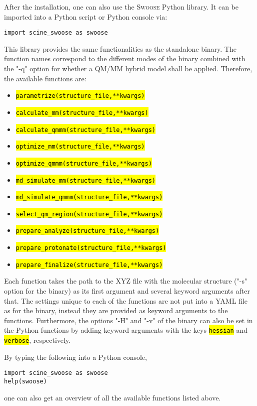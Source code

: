 \documentclass[]{tufte-book}
\begin{document}
After the installation, one can also use the \textsc{Swoose} Python library. It can be imported into
a Python script or Python console via:
\begin{mdframed}[backgroundcolor=LightSteelBlue!25, linewidth=0pt]
\begin{verbatim}
import scine_swoose as swoose
\end{verbatim}
\end{mdframed}
This library provides the same functionalities as the standalone binary. The function names correspond to the different modes of the binary combined with the "-q" option for whether a QM/MM hybrid model shall be applied. Therefore, the available functions are:
\begin{itemize}
\item \hl{\texttt{parametrize\:(structure\_file,\:**kwargs)}}
\item \hl{\texttt{calculate\_mm\:(structure\_file,\:**kwargs)}}
\item \hl{\texttt{calculate\_qmmm\:(structure\_file,\:**kwargs)}}
\item \hl{\texttt{optimize\_mm\:(structure\_file,\:**kwargs)}}
\item \hl{\texttt{optimize\_qmmm\:(structure\_file,\:**kwargs)}}
\item \hl{\texttt{md\_simulate\_mm\:(structure\_file,\:**kwargs)}}
\item \hl{\texttt{md\_simulate\_qmmm\:(structure\_file,\:**kwargs)}}
\item \hl{\texttt{select\_qm\_region\:(structure\_file,\:**kwargs)}}
\item \hl{\texttt{prepare\_analyze\:(structure\_file,\:**kwargs)}}
\item \hl{\texttt{prepare\_protonate\:(structure\_file,\:**kwargs)}}
\item \hl{\texttt{prepare\_finalize\:(structure\_file,\:**kwargs)}}
\end{itemize}

Each function takes the path to the XYZ file with the molecular structure ("-s" option for the binary) as its first argument and several keyword arguments after that. The settings unique to each of the functions are not put into a YAML file as for the binary, instead they are provided as keyword arguments to the functions. Furthermore, the options "-H" and "-v" of the binary can also be set in the Python functions by adding keyword arguments with the keys \hl{\texttt{hessian}} and \hl{\texttt{verbose}}, respectively.

By typing the following into a Python console,
\begin{mdframed}[backgroundcolor=LightSteelBlue!25, linewidth=0pt]
\begin{verbatim}
import scine_swoose as swoose
help(swoose)
\end{verbatim}
\end{mdframed}
one can also get an overview of all the available functions listed above.
\end{document}
